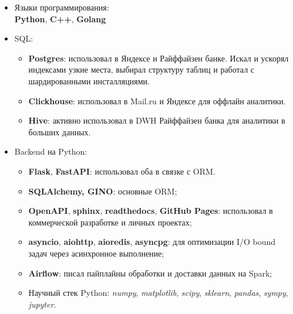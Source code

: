 \begin{itemize}
	\item Языки программирования: \\
        \textbf{Python}, \textbf{C++}, \textbf{Golang}
    \item SQL:
        \begin{itemize}
            \item \textbf{Postgres}: использовал в Яндексе и Райффайзен банке.
            Искал и ускорял индексами узкие места, выбирал структуру таблиц
            и работал с шардированными инсталляциями.
            \item \textbf{Clickhouse}: использовал в Mail.ru и Яндексе для оффлайн аналитики.
            \item \textbf{Hive}: активно использовал в DWH Райффайзен банка для аналитики в больших данных.
        \end{itemize}
    \item Backend на Python:
        \begin{itemize}
            \item \textbf{Flask}, \textbf{FastAPI}: использовал оба в связке с ORM.
            \item \textbf{SQLAlchemy, GINO}: основные ORM;
            \item \textbf{OpenAPI}, \textbf{sphinx}, \textbf{readthedocs}, \textbf{GitHub Pages}: использовал в коммерческой разработке и личных проектах;
            \item \textbf{asyncio}, \textbf{aiohttp}, \textbf{aioredis}, \textbf{asyncpg}: для оптимизации I/O bound задач через асинхронное выполнение;
            \item \textbf{Airflow}: писал пайплайны обработки и доставки данных на Spark;
            \item Научный стек Python: \textit{numpy}, \textit{matplotlib}, \textit{scipy}, \textit{sklearn}, \textit{pandas}, \textit{sympy}, \textit{jupyter}.

\end{itemize}
\end{itemize}
